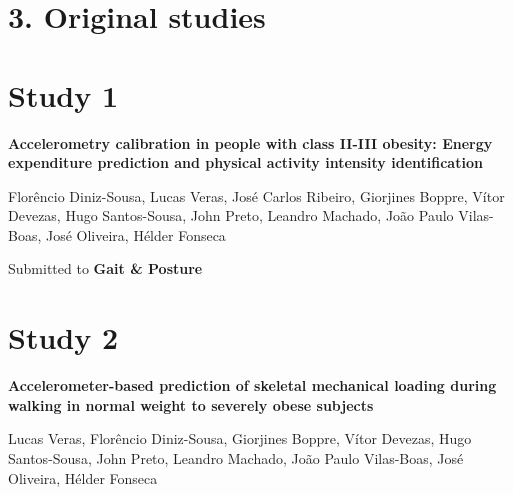 \documentclass[12pt]{article}
\def\blankpage{%
      \clearpage%
      \thispagestyle{empty}%
      \addtocounter{page}{+0}%
      \null%
      \clearpage}
\begin{document}
\pagebreak

\renewcommand{\refnamereview}{\large References}
\vspace{0.5em}
\blankpage

\section*{\vfill\raggedleft\bfseries 3. Original studies}
\thispagestyle{empty} 
\blankpage

\section*{\vfill\raggedleft\bfseries Study 1}
\noindent \textbf{Accelerometry calibration in people with class II-III obesity: Energy expenditure prediction and physical activity intensity identification}

\bigskip

\noindent Florêncio Diniz-Sousa, Lucas Veras, José Carlos Ribeiro, Giorjines Boppre, Vítor Devezas, Hugo Santos-Sousa, John Preto, Leandro Machado, João Paulo Vilas-Boas, José Oliveira, Hélder Fonseca

\bigskip

\noindent Submitted to \textbf{Gait \& Posture}
\thispagestyle{empty}
\blankpage


\pagebreak

\section*{\vfill\raggedleft\bfseries Study 2}
\noindent \textbf{Accelerometer-based prediction of skeletal mechanical loading during walking in normal weight to severely obese subjects}

\bigskip

\noindent Lucas Veras, Florêncio Diniz-Sousa, Giorjines Boppre, Vítor Devezas, Hugo Santos-Sousa, John Preto, Leandro Machado, João Paulo Vilas-Boas, José Oliveira, Hélder Fonseca
\end{document}
